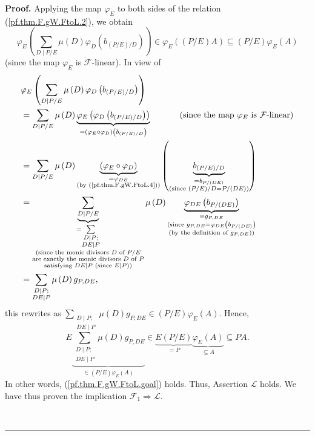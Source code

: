 \documentclass[numbers=enddot,12pt,final,onecolumn,notitlepage]{scrartcl}%
\theoremstyle{definition}
\newenvironment{proof}[1][Proof]{\noindent\textbf{#1.} }{\ \rule{0.5em}{0.5em}}
\let\sumnonlimits\sum
\renewcommand{\sum}{\sumnonlimits\limits}
\begin{document}
\begin{proof}
Applying the map $\varphi_{E}$ to both sides of the relation
(\ref{pf.thm.F.gW.FtoL.2}), we obtain%
\[
\varphi_{E}\left(  \sum_{D\mid P/E}\mu\left(  D\right)  \varphi_{D}\left(
b_{\left(  P/E\right)  /D}\right)  \right)  \in\varphi_{E}\left(  \left(
P/E\right)  A\right)  \subseteq\left(  P/E\right)  \varphi_{E}\left(
A\right)
\]
(since the map $\varphi_{E}$ is $\mathcal{F}$-linear). In view of%
\begin{align*}
&  \varphi_{E}\left(  \sum_{D\mid P/E}\mu\left(  D\right)  \varphi_{D}\left(
b_{\left(  P/E\right)  /D}\right)  \right) \\
&  =\sum_{D\mid P/E}\mu\left(  D\right)  \underbrace{\varphi_{E}\left(
\varphi_{D}\left(  b_{\left(  P/E\right)  /D}\right)  \right)  }_{=\left(
\varphi_{E}\circ\varphi_{D}\right)  \left(  b_{\left(  P/E\right)  /D}\right)
}\ \ \ \ \ \ \ \ \ \ \left(  \text{since the map }\varphi_{E}\text{ is
}\mathcal{F}\text{-linear}\right) \\
&  =\sum_{D\mid P/E}\mu\left(  D\right)  \underbrace{\left(  \varphi_{E}%
\circ\varphi_{D}\right)  }_{\substack{=\varphi_{DE}\\\text{(by
(\ref{pf.thm.F.gW.FtoL.4}))}}}\left(  \underbrace{b_{\left(  P/E\right)  /D}%
}_{\substack{=b_{P/\left(  DE\right)  }\\\text{(since }\left(  P/E\right)
/D=P/\left(  DE\right)  \text{)}}}\right) \\
&  =\underbrace{\sum_{D\mid P/E}}_{\substack{=\sum_{\substack{D\mid P;\\DE\mid
P}}\\\text{(since the monic divisors }D\text{ of }P/E\\\text{are exactly the
monic divisors }D\text{ of }P\\\text{satisfying }DE\mid P\text{ (since }E\mid
P\text{))}}}\mu\left(  D\right)  \underbrace{\varphi_{DE}\left(  b_{P/\left(
DE\right)  }\right)  }_{\substack{=g_{P,DE}\\\text{(since }g_{P,DE}%
=\varphi_{DE}\left(  b_{P/\left(  DE\right)  }\right)  \\\text{(by the
definition of }g_{P,DE}\text{))}}}\\
&  =\sum_{\substack{D\mid P;\\DE\mid P}}\mu\left(  D\right)  g_{P,DE},
\end{align*}
this rewrites as $\sum_{\substack{D\mid P;\\DE\mid P}}\mu\left(  D\right)
g_{P,DE}\in\left(  P/E\right)  \varphi_{E}\left(  A\right)  $. Hence,%
\[
E\underbrace{\sum_{\substack{D\mid P;\\DE\mid P}}\mu\left(  D\right)
g_{P,DE}}_{\in\left(  P/E\right)  \varphi_{E}\left(  A\right)  }%
\in\underbrace{E\left(  P/E\right)  }_{=P}\underbrace{\varphi_{E}\left(
A\right)  }_{\subseteq A}\subseteq PA.
\]
In other words, (\ref{pf.thm.F.gW.FtoL.goal}) holds. Thus, Assertion
$\mathcal{L}$ holds. We have thus proven the implication $\mathcal{F}%
_{1}\Longrightarrow\mathcal{L}$.


\end{proof}
\end{document}
